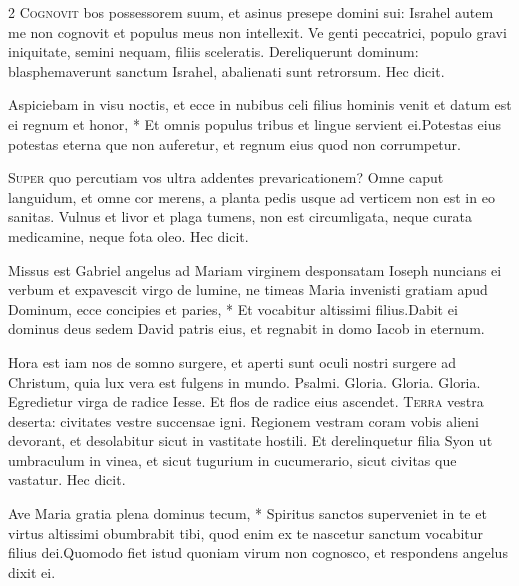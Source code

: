 \begin{multicols*}{2}
\lettrine[lines=2]{\zallmancaps \color{Red} C}{ognovit} bos possessorem suum, et asinus presepe domini sui: Israhel autem me non cognovit et populus meus non intellexit. Ve genti peccatrici, populo gravi iniquitate, semini nequam, filiis sceleratis. Dereliquerunt dominum: blasphemaverunt sanctum Israhel, abalienati sunt retrorsum. Hec dicit.
\begin{responsory}[aspiciebam]
{Aspiciebam in visu noctis, et ecce in nubibus celi filius hominis venit et datum est ei regnum et honor, * Et omnis populus tribus et lingue servient ei.}{Potestas eius potestas eterna que non auferetur, et regnum eius quod non corrumpetur.}
\end{responsory}%
\lettrine[lines=2]{\zallmancaps \color{Blue} S}{uper} quo percutiam vos ultra addentes prevaricationem? Omne caput languidum, et omne cor merens, a planta pedis usque ad verticem non est in eo sanitas. Vulnus et livor et plaga tumens, non est circumligata, neque curata medicamine, neque fota oleo. Hec dicit.
\begin{responsory-doxology}
{Missus est Gabriel angelus ad Mariam virginem desponsatam Ioseph nuncians ei verbum et expavescit virgo de lumine, ne timeas Maria invenisti gratiam apud Dominum, ecce concipies et paries, * Et vocabitur altissimi filius.}{Dabit ei dominus deus sedem David patris eius, et regnabit in domo Iacob in eternum.}
\end{responsory-doxology}%
 Hora est iam nos de somno surgere, et aperti sunt oculi nostri surgere ad Christum, quia lux vera est fulgens in mundo. {\color{Red} Psalmi.}
 Gloria.
 Gloria.
 Gloria. \V Egredietur virga de radice Iesse. \R Et flos de radice eius ascendet.
\lettrine[lines=2]{\zallmancaps \color{Red} T}{erra} vestra deserta: civitates vestre succensae igni. Regionem vestram coram vobis alieni
devorant, et desolabitur sicut in vastitate hostili. Et derelinquetur filia Syon ut umbraculum in vinea, et sicut tugurium in cucumerario, sicut civitas que vastatur. Hec dicit.
\begin{responsory}
{Ave Maria gratia plena dominus tecum, * Spiritus sanctos superveniet in te et virtus altissimi obumbrabit tibi, quod enim ex te nascetur sanctum vocabitur filius dei.}{Quomodo fiet istud quoniam virum non cognosco, et respondens angelus dixit ei.}

\end{responsory}
\end{multicols*}
